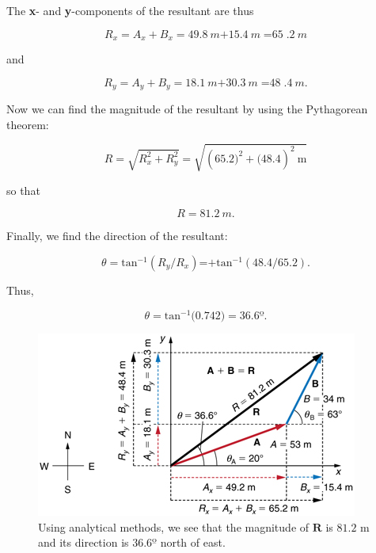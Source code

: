 \documentclass[
]{book}
\begin{document}
The \textbf{x}- and \textbf{y}-components of the resultant are thus

\leavevmode{}%
\[{{{R_{x} = {A_{x} + B_{x}}} = \text{49}}\text{.}8\ m{+ \text{15}}\text{.}4\ m{= \text{65}}\text{.}2\ m}{}\]

and

\leavevmode{}%
\[{{{R_{y} = {A_{y} + B_{y}}} = \text{18}}\text{.}1\ m{+ \text{30}}\text{.}3\ m{= \text{48}}\text{.}4\ m\text{.}}{}\]

Now we can find the magnitude of the resultant by using the Pythagorean
theorem:

\leavevmode{}%
\[{{R = \sqrt{R_{x}^{2} + R_{y}^{2}}} = \sqrt{{(\text{65}\text{.}2{)^{2} + (}\text{48}\text{.}4)^{2}}\ \text{m}}}{}\]

so that

\leavevmode{}%
\[R = 81.2\ m.\]

Finally, we find the direction of the resultant:

\leavevmode{}%
\[{{{\theta = \text{tan}^{- 1}}({R_{y}/R_{x}})\text{=+}\text{tan}^{- 1}(\text{48}\text{.}{4/\text{65}}\text{.}2)}\text{.}}{}\]

Thus,

\leavevmode{}%
\[{{\theta = \text{tan}^{- 1}}(0\text{.}\text{742}{) = \text{36}}\text{.}6º\text{.}}{}\]

\begin{figure}
\hypertarget{import-auto-id1165298804108}{%
\centering
\includegraphics{images/Figure_03_03_09a.jpg}
\caption{Using analytical methods, we see that the magnitude of \(\mathbf{R}{}\)
is \({\text{81}\text{.}\text{2\ m}}{}\) and its direction is
\({\text{36}\text{.}6º}{}\) north of
east.}\label{import-auto-id1165298804108}
}
\end{figure}
\end{document}
